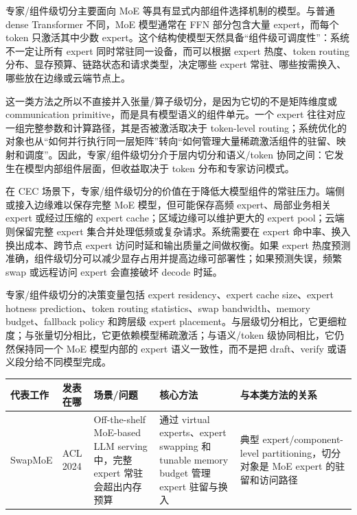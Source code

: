 \documentclass[a4paper,10pt]{ctexart}
\begin{document}
专家/组件级切分主要面向 MoE 等具有显式内部组件选择机制的模型。与普通 dense Transformer 不同，MoE 模型通常在 FFN 部分包含大量 expert，而每个 token 只激活其中少数 expert。这个结构使模型天然具备“组件级可调度性”：系统不一定让所有 expert 同时常驻同一设备，而可以根据 expert 热度、token routing 分布、显存预算、链路状态和请求类型，决定哪些 expert 常驻、哪些按需换入、哪些放在边缘或云端节点上。


这一类方法之所以不直接并入张量/算子级切分，是因为它切的不是矩阵维度或 communication primitive，而是具有模型语义的组件单元。一个 expert 往往对应一组完整参数和计算路径，其是否被激活取决于 token-level routing；系统优化的对象也从“如何并行执行同一层矩阵”转向“如何管理大量稀疏激活组件的驻留、映射和调度”。因此，专家/组件级切分介于层内切分和语义/token 协同之间：它发生在模型内部组件层面，但收益取决于 token 分布和专家访问模式。


在 CEC 场景下，专家/组件级切分的价值在于降低大模型组件的常驻压力。端侧或接入边缘难以保存完整 MoE 模型，但可能保存高频 expert、局部业务相关 expert 或经过压缩的 expert cache；区域边缘可以维护更大的 expert pool；云端则保留完整 expert 集合并处理低频或复杂请求。系统需要在 expert 命中率、换入换出成本、跨节点 expert 访问时延和输出质量之间做权衡。如果 expert 热度预测准确，组件级切分可以减少显存占用并提高边缘可部署性；如果预测失误，频繁 swap 或远程访问 expert 会直接破坏 decode 时延。


专家/组件级切分的决策变量包括 expert residency、expert cache size、expert hotness prediction、token routing statistics、swap bandwidth、memory budget、fallback policy 和跨层级 expert placement。与层级切分相比，它更细粒度；与张量切分相比，它更依赖模型稀疏激活；与语义/token 级协同相比，它仍然保持同一个 MoE 模型内部的 expert 语义一致性，而不是把 draft、verify 或语义段分给不同模型完成。


\begin{table}[H]
\centering
\scriptsize
\setlength{\tabcolsep}{3pt}
\renewcommand{\arraystretch}{1.15}
\begin{tabularx}{\textwidth}{|X|X|X|X|X|}
\hline
\textbf{代表工作} & \textbf{发表在哪} & \textbf{场景/问题} & \textbf{核心方法} & \textbf{与本类方法的关系} \\ \hline
SwapMoE & ACL 2024 & Off-the-shelf MoE-based LLM serving 中，完整 expert 常驻会超出内存预算 & 通过 virtual experts、expert swapping 和 tunable memory budget 管理 expert 驻留与换入 & 典型 expert/component-level partitioning，切分对象是 MoE expert 的驻留和访问路径 \\ \hline
\end{tabularx}
\end{table}
\end{document}
